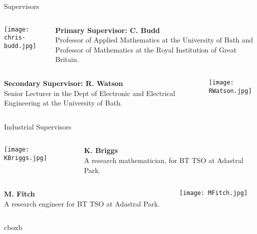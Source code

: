 \documentclass[final]{beamer}
\theoremstyle{plain}
\theoremstyle{definition}
\theoremstyle{remark}
\newlength{\onecolwid}
\begin{document}
\begin{frame}[t]
\begin{columns}[t]
\begin{column}{\onecolwid}
\begin{block}{Supervisors}
\vspace{-2cm}
\begin{columns}
\begin{column}{0.25\linewidth}
\texttt{[image: chris-budd.jpg]}
\end{column}
\begin{column}{0.75\linewidth}
\textbf{Primary Supervisor: C. Budd}
 \\
Professor of Applied Mathematics at the University of Bath and Professor of Mathematics at the Royal Institution of Great Britain. \\
\end{column}
\end{columns}
\vspace{1cm}
\begin{columns}
\begin{column}{0.75\linewidth}
\textbf{Secondary Supervisor: R. Watson}
 \\
Senior Lecturer in the Dept of Electronic and Electrical Engineering at the University of Bath. \\
\end{column}
\begin{column}{0.25\linewidth}
\texttt{[image: RWatson.jpg]}
\end{column}
\end{columns}
\end{block}

\begin{alertblock}{Industrial Supervisors}

\begin{columns}
\begin{column}{0.24\linewidth}
\texttt{[image: KBriggs.jpg]}
\end{column}
\begin{column}{0.74\linewidth}
\textbf{K. Briggs}
 \\
A research mathematician, for BT TSO at Adastral Park. \\
\end{column}
\end{columns}
\begin{columns}
\begin{column}{0.7\linewidth}
\textbf{M. Fitch}
 \\
A research engineer for BT TSO at Adastral Park. \\
\end{column}
\begin{column}{0.24\linewidth}
\texttt{[image: MFitch.jpg]}
\end{column}
\end{columns}
\end{alertblock}
 \hspace{0.5in}
 \begin{beamercolorbox}[wd=10in,colsep=0.15cm]{cboxb}
 \end{beamercolorbox}
 \vspace{0.1in}




\end{column}
\end{columns}
\end{frame}
\end{document}

